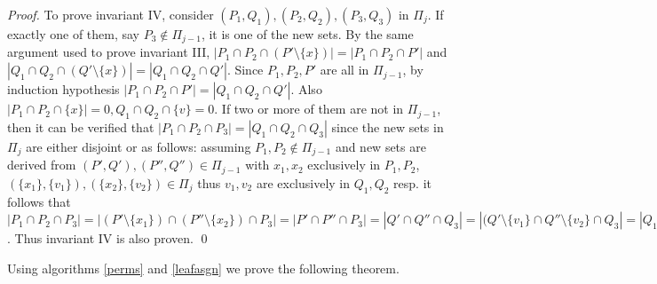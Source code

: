 \documentclass[MS]             %
              {iitmdiss_as}    %
\begin{document}
\begin{proof}
  \noindent
  To prove invariant IV, consider $(P_1,Q_1),(P_2,Q_2), (P_3,Q_3)$ in
  $\Pi_j$. If exactly one of them, say $P_3 \notin \Pi_{j-1}$, it is
  one of the new sets. By the same argument used to prove invariant
  III, $|P_1 \cap P_2 \cap (P' \setminus \{x\})| = |P_1 \cap P_2 \cap
  P'|$ and $|Q_1 \cap Q_2 \cap (Q' \setminus \{x\})| = |Q_1 \cap Q_2
  \cap Q'|$. Since $P_1, P_2, P'$ are all in $\Pi_{j-1}$, by induction
  hypothesis $|P_1 \cap P_2 \cap P'| = |Q_1 \cap Q_2 \cap Q'|$. Also
  $|P_1 \cap P_2 \cap \{x\}| = 0, Q_1 \cap Q_2 \cap \{v\} = 0$.  If
  two or more of them are not in $\Pi_{j-1}$, then it can be verified
  that $|P_1 \cap P_2 \cap P_3| = |Q_1 \cap Q_2 \cap Q_3|$ since the
  new sets in $\Pi_j$ are either disjoint or as follows: assuming
  $P_1, P_2 \notin \Pi_{j-1}$ and new sets are derived from $(P', Q'),
  (P'', Q'') \in \Pi_{j-1}$ with $x_1, x_2$ exclusively in $P_1, P_2$,
  $(\{x_1\},\{v_1\}), (\{x_2\},\{v_2\}) \in \Pi_j $ thus $v_1, v_2$
  are exclusively in $Q_1, Q_2$ resp. it follows that $|P_1 \cap P_2
  \cap P_3| = |(P' \setminus \{x_1\}) \cap (P'' \setminus \{x_2\})
  \cap P_3| = |P' \cap P'' \cap P_3| = |Q' \cap Q'' \cap Q_3| = |(Q'
  \setminus \{v_1\} \cap Q'' \setminus \{v_2\} \cap Q_3| = |Q_1 \cap
  Q_2 \cap Q_3|$. Thus invariant IV is also proven.  \qed
\end{proof}

\noindent
Using algorithms \ref{perms} and \ref{leafasgn} we prove the following
theorem.
\end{document}
